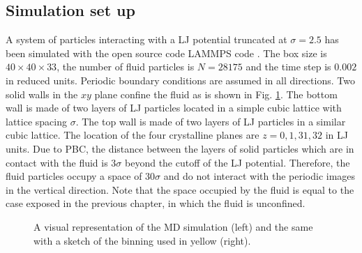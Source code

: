 \documentclass[b5paper,openright,10pt]{book}
\begin{document}
\subsection{Simulation set up}
A system of particles interacting  with a LJ potential 
truncated at $\sigma=2.5$ has been simulated with the open source code LAMMPS code \cite{Plimpton1995}. The
box size  is $40\times40\times33$,  the number  of fluid  particles is
$N=28175$ and  the time step  is $0.002$ in reduced  units.  Periodic
boundary conditions are assumed  in all directions.   Two solid
walls in the $xy$ plane confine the fluid as is shown in Fig. \ref{fig:WallsBox}.  The bottom wall is made of
two layers  of LJ  particles located  in a  simple cubic  lattice with
lattice spacing  $\sigma$. The top  wall is made  of two layers  of LJ
particles  in a  similar  cubic  lattice.  The  location  of the  four
crystalline planes  are $z=0,1,31,32$  in LJ units.   Due to  PBC, the
distance between  the layers of  solid particles which are  in contact
with   the  fluid   is  $3\sigma$   beyond  the   cutoff  of   the  LJ
potential. Therefore, the fluid particles occupy a space of $30\sigma$
and  do  not  interact  with  the  periodic  images  in  the  vertical
direction. Note that the space occupied by the fluid is equal to the case exposed in the previous chapter, in which the fluid is unconfined. 
\begin{figure}
    \centering
    \caption[Visual representation of the MD simulation of a confined fluid between two solid slabs]{A visual representation of the MD simulation (left) and the same with a sketch of the binning used in yellow (right).}
    \label{fig:WallsBox}
\end{figure}
\end{document}
